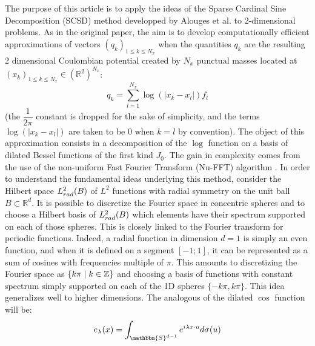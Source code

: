 \documentclass[11pt,a4paper]{article}
\begin{document}
The purpose of this article is to apply the ideas of the Sparse Cardinal Sine Decomposition (SCSD) method developped by Alouges et al. \cite{Alouges2015} to 2-dimensional problems. As in the original paper, the aim is to develop computationally efficient approximations of vectors $(q_k)_{1\leq k \leq N_x}$ when the quantities $q_k$ are the resulting 2 dimensional Coulombian potential created by $N_x$ punctual masses located at $(x_k)_{1 \leq k \leq N_x} \in \left(\mathbb{R}^2\right)^{N_x}$:
\begin{equation}
 q_k = \sum_{l=1}^{N_x} \log(|x_k - x_l|)f_l 
\label{LaSommeACalculerDansLArticle}
\end{equation}
(the $\dfrac{1}{2\pi}$ constant is dropped for the sake of simplicity, and the terms $\log(|x_k - x_l|)$ are taken to be $0$ when $k=l$ by convention). The object of this approximation consists in a decomposition of the $\log$ function on a basis of dilated Bessel functions of the first kind $J_0$. The gain in complexity comes from the use of the non-uniform Fast Fourier Transform (Nu-FFT) algorithm \cite{NuFFT}. In order to understand the fundamental ideas underlying this method, consider the Hilbert space $L^2_{rad}(B)$ of $L^2$ functions with radial symmetry on the unit ball $B \subset \mathbb{R}^d$. It is possible to discretize the Fourier space in concentric spheres and to choose a Hilbert basis of $L^2_{rad}(B)$ which elements have their spectrum supported on each of those spheres. This is closely linked to the Fourier transform for periodic functions. Indeed, a radial function in dimension $d=1$ is simply an even function, and when it is defined on a segment $[-1;1]$, it can be represented as a sum of cosines with frequencies multiple of $\pi$. This amounts to discretizing the Fourier space as $\left\{k\pi\mathrel{}\middle|\mathrel{}k \in \mathbb{Z}\right\}$ and choosing a basis of functions with constant spectrum simply supported on each of the 1D spheres $\{-k\pi,k\pi\}$. This idea generalizes well to higher dimensions. The analogous of the dilated $\cos$ function will be: 
\begin{equation}
e_\lambda(x) = \int_{\mathbbm{S}^{d-1}} e^{i\lambda x \cdot  u} d\sigma(u)
\label{FormeSphere}
\end{equation}
\end{document}
